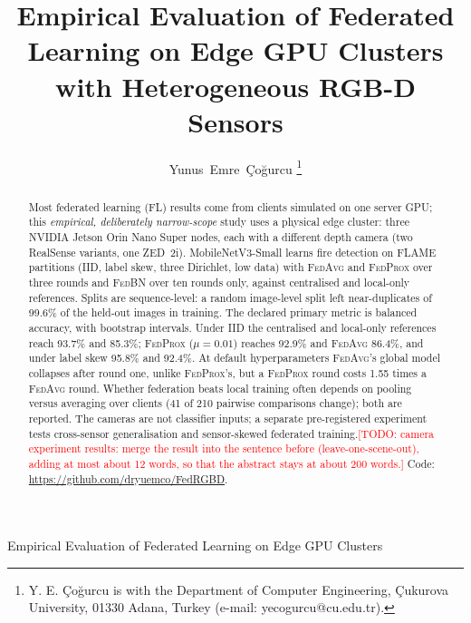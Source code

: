 \documentclass[journal]{IEEEtran}
\newcommand{\fedavg}{\textsc{FedAvg}}
\newcommand{\fedprox}{\textsc{FedProx}}
\newcommand{\fedbn}{\textsc{FedBN}}
\newcommand{\todo}[1]{\textcolor{red}{[TODO: #1]}}
\begin{document}
\title{Empirical Evaluation of Federated Learning on Edge GPU Clusters with Heterogeneous RGB-D Sensors}

\author{Yunus~Emre~\c{C}o\u{g}urcu%
\thanks{Y. E. \c{C}o\u{g}urcu is with the Department of Computer Engineering, \c{C}ukurova University, 01330 Adana, Turkey (e-mail: yecogurcu@cu.edu.tr).}%
}

%
{Empirical Evaluation of Federated Learning on Edge GPU Clusters}

\maketitle

\begin{abstract}
Most federated learning (FL) results come from clients simulated on one server GPU; this \emph{empirical, deliberately narrow-scope} study uses a physical edge cluster: three NVIDIA Jetson Orin Nano Super nodes, each with a different depth camera (two RealSense variants, one ZED~2i). MobileNetV3-Small learns fire detection on FLAME partitions (IID, label skew, three Dirichlet, low data) with \fedavg{} and \fedprox{} over three rounds and \fedbn{} over ten rounds only, against centralised and local-only references. Splits are sequence-level: a random image-level split left near-duplicates of 99.6\% of the held-out images in training. The declared primary metric is balanced accuracy, with bootstrap intervals. Under IID the centralised and local-only references reach 93.7\% and 85.3\%; \fedprox{} ($\mu=0.01$) reaches 92.9\% and \fedavg{} 86.4\%, and under label skew 95.8\% and 92.4\%. At default hyperparameters \fedavg{}'s global model collapses after round one, unlike \fedprox{}'s, but a \fedprox{} round costs 1.55 times a \fedavg{} round. Whether federation beats local training often depends on pooling versus averaging over clients (41 of 210 pairwise comparisons change); both are reported. The cameras are not classifier inputs; a separate pre-registered experiment tests cross-sensor generalisation and sensor-skewed federated training.\todo{camera experiment results: merge the result into the sentence before (leave-one-scene-out), adding at most about 12 words, so that the abstract stays at about 200 words.} Code: \url{https://github.com/dryuemco/FedRGBD}.
\end{abstract}
\end{document}
